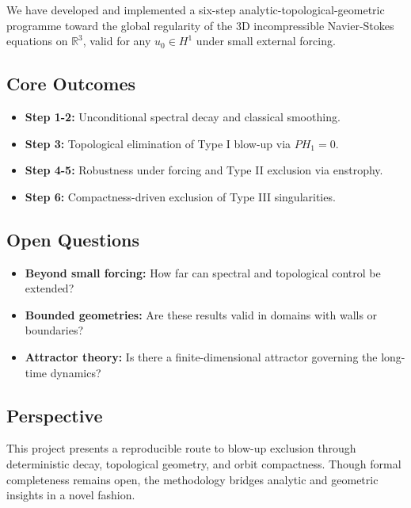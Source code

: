 \documentclass[11pt]{article}
\theoremstyle{definition}
\begin{document}
We have developed and implemented a six-step analytic-topological-geometric programme toward the global regularity of the 3D incompressible Navier-Stokes equations on $\mathbb{R}^3$, valid for any $u_0 \in H^1$ under small external forcing.

\subsection*{Core Outcomes}

\begin{itemize}
  \item \textbf{Step 1-2:} Unconditional spectral decay and classical smoothing.
  \item \textbf{Step 3:} Topological elimination of Type I blow-up via $PH_1 = 0$.
  \item \textbf{Step 4-5:} Robustness under forcing and Type II exclusion via enstrophy.
  \item \textbf{Step 6:} Compactness-driven exclusion of Type III singularities.
\end{itemize}

\subsection*{Open Questions}

\begin{itemize}
  \item \textbf{Beyond small forcing:} How far can spectral and topological control be extended?
  \item \textbf{Bounded geometries:} Are these results valid in domains with walls or boundaries?
  \item \textbf{Attractor theory:} Is there a finite-dimensional attractor governing the long-time dynamics?
\end{itemize}

\subsection*{Perspective}

This project presents a reproducible route to blow-up exclusion through deterministic decay, topological geometry, and orbit compactness. Though formal completeness remains open, the methodology bridges analytic and geometric insights in a novel fashion.

\end{document}
